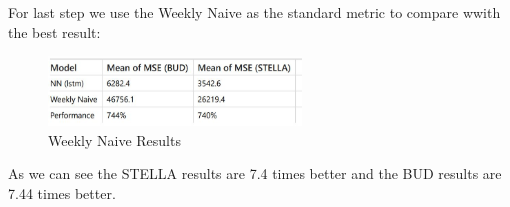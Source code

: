     For last step we use the Weekly Naive as the standard metric to compare wwith the best result:\\

    \begin{figure}[H]
        \centering
        \includegraphics[width=0.6\textwidth]{assets/mult11.jpeg}
        \caption{Weekly Naive Results}
        \label{fig:notas}
        \end{figure}    

As we can see the STELLA results are 7.4 times better and the BUD results are 7.44 times better.




